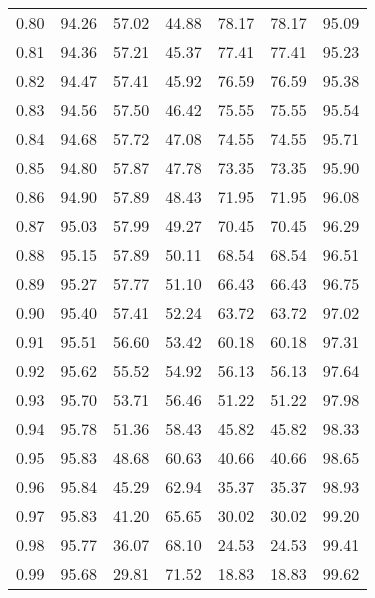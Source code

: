 \begin{tabular}{|c|c|c|c|c|c|c|}
      0.80 &     94.26 &     57.02 &      44.88 &   78.17 &      78.17 &         95.09 \\
      0.81 &     94.36 &     57.21 &      45.37 &   77.41 &      77.41 &         95.23 \\
      0.82 &     94.47 &     57.41 &      45.92 &   76.59 &      76.59 &         95.38 \\
      0.83 &     94.56 &     57.50 &      46.42 &   75.55 &      75.55 &         95.54 \\
      0.84 &     94.68 &     57.72 &      47.08 &   74.55 &      74.55 &         95.71 \\
      0.85 &     94.80 &     57.87 &      47.78 &   73.35 &      73.35 &         95.90 \\
      0.86 &     94.90 &     57.89 &      48.43 &   71.95 &      71.95 &         96.08 \\
      0.87 &     95.03 &     57.99 &      49.27 &   70.45 &      70.45 &         96.29 \\
      0.88 &     95.15 &     57.89 &      50.11 &   68.54 &      68.54 &         96.51 \\
      0.89 &     95.27 &     57.77 &      51.10 &   66.43 &      66.43 &         96.75 \\
      0.90 &     95.40 &     57.41 &      52.24 &   63.72 &      63.72 &         97.02 \\
      0.91 &     95.51 &     56.60 &      53.42 &   60.18 &      60.18 &         97.31 \\
      0.92 &     95.62 &     55.52 &      54.92 &   56.13 &      56.13 &         97.64 \\
      0.93 &     95.70 &     53.71 &      56.46 &   51.22 &      51.22 &         97.98 \\
      0.94 &     95.78 &     51.36 &      58.43 &   45.82 &      45.82 &         98.33 \\
      0.95 &     95.83 &     48.68 &      60.63 &   40.66 &      40.66 &         98.65 \\
      0.96 &     95.84 &     45.29 &      62.94 &   35.37 &      35.37 &         98.93 \\
      0.97 &     95.83 &     41.20 &      65.65 &   30.02 &      30.02 &         99.20 \\
      0.98 &     95.77 &     36.07 &      68.10 &   24.53 &      24.53 &         99.41 \\
      0.99 &     95.68 &     29.81 &      71.52 &   18.83 &      18.83 &         99.62 \\
\bottomrule
\end{tabular}
